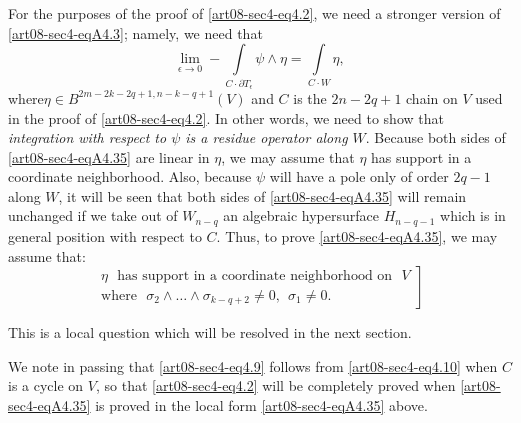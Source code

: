 For the purposes of the proof of \eqref{art08-sec4-eq4.2}, we need a stronger version of \eqref{art08-sec4-eqA4.3}; namely, we need that
\begin{equation*}
\lim\limits_{\epsilon\to 0}-\int\limits_{C\cdot \partial T_{\epsilon}}\psi \wedge \eta=\int\limits_{C\cdot W}\eta,\tag{A4.35}\label{art08-sec4-eqA4.35}
\end{equation*}
where\pageoriginale $\eta\in B^{2m-2k-2q+1,n-k-q+1}(V)$ and $C$ is the $2n-2q+1$ chain on $V$ used in the proof of \eqref{art08-sec4-eq4.2}. In other words, we need to show that {\em integration with respect to $\psi$ is a residue operator along $W$}. Because both sides of \eqref{art08-sec4-eqA4.35} are linear in $\eta$, we may assume that $\eta$ has support in a coordinate neighborhood. Also, because $\psi$ will have a pole only of order $2q-1$ along $W$, it will be seen that both sides of \eqref{art08-sec4-eqA4.35} will remain unchanged if we take out of $W_{n-q}$ an algebraic hypersurface $H_{n-q-1}$ which is in general position with respect to $C$. Thus, to prove \eqref{art08-sec4-eqA4.35}, we may assume that:
\begin{equation*}
\left.
\begin{array}{l}
\eta\text{~ has support in a coordinate neighborhood on~ } V\\[3pt]
\text{where~ } \sigma_{2}\wedge\ldots\wedge \sigma_{k-q+2}\neq 0, \ \ \sigma_{1}\neq  0.
\end{array}\right]\tag{A4.36}\label{art08-sec4-eqA4.36}
\end{equation*}

This is a local question which will be resolved in the next section.

We note in passing that \eqref{art08-sec4-eq4.9} follows from \eqref{art08-sec4-eq4.10} when $C$ is a cycle on $V$, so that \eqref{art08-sec4-eq4.2} will be completely proved when \eqref{art08-sec4-eqA4.35} is proved in the local form \eqref{art08-sec4-eqA4.35} above.

